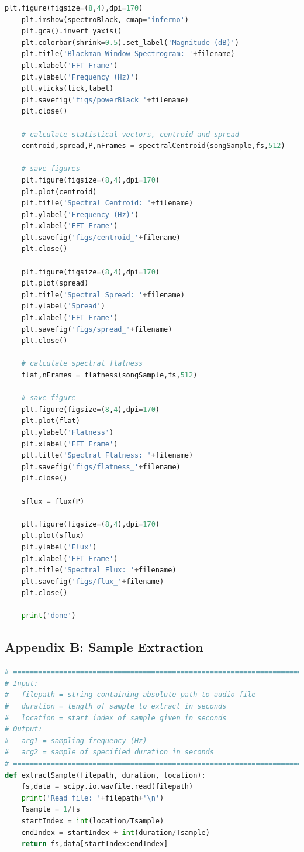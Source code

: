 \documentclass[11pt,a4paper]{article}
\begin{document}
\begin{lstlisting}[language=Python,label={lst:main}]
    plt.figure(figsize=(8,4),dpi=170)
    plt.imshow(spectroBlack, cmap='inferno')
    plt.gca().invert_yaxis()
    plt.colorbar(shrink=0.5).set_label('Magnitude (dB)')
    plt.title('Blackman Window Spectrogram: '+filename)
    plt.xlabel('FFT Frame')
    plt.ylabel('Frequency (Hz)')
    plt.yticks(tick,label)
    plt.savefig('figs/powerBlack_'+filename)
    plt.close()

    # calculate statistical vectors, centroid and spread
    centroid,spread,P,nFrames = spectralCentroid(songSample,fs,512)

    # save figures
    plt.figure(figsize=(8,4),dpi=170)
    plt.plot(centroid)
    plt.title('Spectral Centroid: '+filename)
    plt.ylabel('Frequency (Hz)')
    plt.xlabel('FFT Frame')
    plt.savefig('figs/centroid_'+filename)
    plt.close()

    plt.figure(figsize=(8,4),dpi=170)
    plt.plot(spread)
    plt.title('Spectral Spread: '+filename)
    plt.ylabel('Spread')
    plt.xlabel('FFT Frame')
    plt.savefig('figs/spread_'+filename)
    plt.close()

    # calculate spectral flatness
    flat,nFrames = flatness(songSample,fs,512)

    # save figure
    plt.figure(figsize=(8,4),dpi=170)
    plt.plot(flat)
    plt.ylabel('Flatness')
    plt.xlabel('FFT Frame')
    plt.title('Spectral Flatness: '+filename)
    plt.savefig('figs/flatness_'+filename)
    plt.close()

    sflux = flux(P)

    plt.figure(figsize=(8,4),dpi=170)
    plt.plot(sflux)
    plt.ylabel('Flux')
    plt.xlabel('FFT Frame')
    plt.title('Spectral Flux: '+filename)
    plt.savefig('figs/flux_'+filename)
    plt.close()

    print('done')
	\end{lstlisting}
	
\pagebreak

\subsection{Appendix B: Sample Extraction} \label{app:extractsample}
	\begin{lstlisting}[language=Python,label={lst:extractsample}]
# =============================================================================
# Input:
#   filepath = string containing absolute path to audio file
#   duration = length of sample to extract in seconds
#   location = start index of sample given in seconds
# Output:
#   arg1 = sampling frequency (Hz)
#   arg2 = sample of specified duration in seconds
# =============================================================================
def extractSample(filepath, duration, location):
    fs,data = scipy.io.wavfile.read(filepath)
    print('Read file: '+filepath+'\n')
    Tsample = 1/fs
    startIndex = int(location/Tsample)
    endIndex = startIndex + int(duration/Tsample)
    return fs,data[startIndex:endIndex]
	\end{lstlisting}
\end{document}
